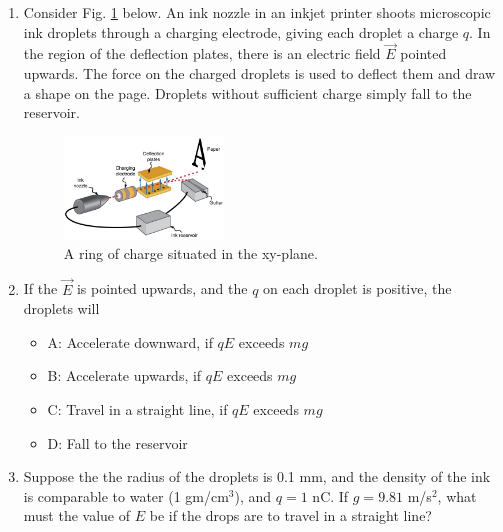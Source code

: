 \documentclass{article}
\begin{document}
\begin{enumerate}
\item Consider Fig. \ref{fig:ring} below.  An ink nozzle in an inkjet printer shoots microscopic ink droplets through a charging electrode, giving each droplet a charge $q$.  In the region of the deflection plates, there is an electric field $\vec{E}$ pointed upwards.  The force on the charged droplets is used to deflect them and draw a shape on the page.  Droplets without sufficient charge simply fall to the reservoir.
\begin{figure}[ht]
\centering
\includegraphics[width=0.4\textwidth]{inkjet.jpeg}
\caption{\label{fig:ring} A ring of charge situated in the xy-plane.}
\end{figure}
\item If the $\vec{E}$ is pointed upwards, and the $q$ on each droplet is positive, the droplets will
\begin{itemize}
\item A: Accelerate downward, if $q E$ exceeds $m g$
\item B: Accelerate upwards, if $q E$ exceeds $m g$
\item C: Travel in a straight line, if $q E$ exceeds $m g$
\item D: Fall to the reservoir
\end{itemize}
\item Suppose the the radius of the droplets is 0.1 mm, and the density of the ink is comparable to water (1 gm/cm$^3$), and $q = 1$ nC.  If $g = 9.81$ m/s$^2$, what must the value of $E$ be if the drops are to travel in a straight line?
\end{enumerate}
\end{document}
